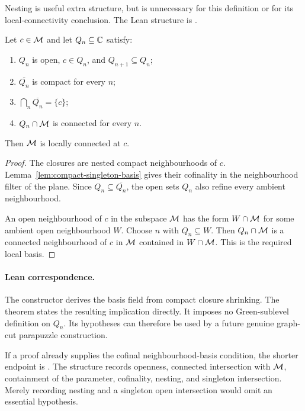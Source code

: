 Nesting is useful extra structure, but is unnecessary for this
definition or for its local-connectivity conclusion.
The Lean structure is
.

\begin{theorem}
\label{thm:parameter-shrinking}
Let $c\in\mathcal M$ and let $Q_n\subseteq\mathbb C$ satisfy:
\begin{enumerate}
\item $Q_n$ is open, $c\in Q_n$, and $Q_{n+1}\subseteq Q_n$;
\item $\overline{Q_n}$ is compact for every $n$;
\item $\bigcap_n\overline{Q_n}=\{c\}$;
\item $Q_n\cap\mathcal M$ is connected for every $n$.
\end{enumerate}
Then $\mathcal M$ is locally connected at $c$.
\end{theorem}

\begin{proof}
The closures are nested compact neighbourhoods of $c$.
Lemma~\ref{lem:compact-singleton-basis} gives their cofinality in the
neighbourhood filter of the plane.  Since $Q_n\subseteq\overline{Q_n}$,
the open sets $Q_n$ also refine every ambient neighbourhood.

An open neighbourhood of $c$ in the subspace $\mathcal M$ has the form
$W\cap\mathcal M$ for some ambient open neighbourhood $W$.  Choose $n$ with
$Q_n\subseteq W$.  Then $Q_n\cap\mathcal M$ is a connected neighbourhood
of $c$ in $\mathcal M$ contained in $W\cap\mathcal M$.  This is the required local
basis.
\end{proof}

\paragraph{Lean correspondence.}
The constructor
derives the basis field from compact closure shrinking.  The theorem
states the resulting implication directly.
It imposes no Green-sublevel definition on $Q_n$.
Its hypotheses can therefore be used by a future genuine graph-cut
parapuzzle construction.

If a proof already supplies the cofinal neighbourhood-basis condition,
the shorter endpoint is
.  The structure
 records openness, connected intersection
with $\mathcal M$, containment of the parameter, cofinality, nesting, and
singleton intersection.  Merely recording nesting and a singleton open
intersection would omit an essential hypothesis.

